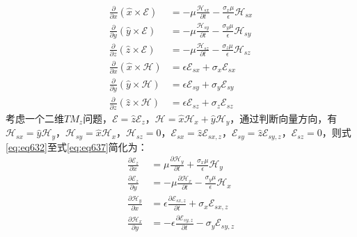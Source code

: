 \documentclass{article}
\numberwithin{equation}{section}
\renewcommand{\vec}[1]{\boldsymbol{#1}}
\begin{document}
\begin{align}
    \label{eq:eq632}
    \frac{\partial}{\partial x}(\hat{x}\times\vec{\mathcal{E}})&=-\mu\frac{\vec{\mathcal{H}}_{sx}}{\partial t}-\frac{\sigma_x\mu}{\epsilon}\vec{\mathcal{H}}_{sx} \\
    \label{eq:eq633}
    \frac{\partial}{\partial y}(\hat{y}\times\vec{\mathcal{E}})&=-\mu\frac{\vec{\mathcal{H}}_{sy}}{\partial t}-\frac{\sigma_y\mu}{\epsilon}\vec{\mathcal{H}}_{sy} \\
    \label{eq:eq634}
    \frac{\partial}{\partial z}(\hat{z}\times\vec{\mathcal{E}})&=-\mu\frac{\vec{\mathcal{H}}_{sz}}{\partial t}-\frac{\sigma_z\mu}{\epsilon}\vec{\mathcal{H}}_{sz} \\
    \label{eq:eq635}
    \frac{\partial}{\partial x}(\hat{x}\times\vec{\mathcal{H}})&=\epsilon\vec{\mathcal{E}}_{sx}+\sigma_x\vec{\mathcal{E}}_{sx} \\
    \label{eq:eq636}
    \frac{\partial}{\partial y}(\hat{y}\times\vec{\mathcal{H}})&=\epsilon\vec{\mathcal{E}}_{sy}+\sigma_y\vec{\mathcal{E}}_{sy} \\
    \label{eq:eq637}
    \frac{\partial}{\partial z}(\hat{z}\times\vec{\mathcal{H}})&=\epsilon\vec{\mathcal{E}}_{sz}+\sigma_z\vec{\mathcal{E}}_{sz}
\end{align}
考虑一个二维$TM_z$问题，$\vec{\mathcal{E}}=\hat{z}\mathcal{E}_z$，$\vec{\mathcal{H}}=\hat{x}\mathcal{H}_x+\hat{y}\mathcal{H}_y$，通过判断向量方向，有$\vec{\mathcal{H}}_{sx}=\hat{y}\mathcal{H}_y$，$\vec{\mathcal{H}}_{sy}=\hat{x}\mathcal{H}_x$，$\vec{\mathcal{H}}_{sz}=0$，$\vec{\mathcal{E}}_{sx}=\hat{z}\mathcal{E}_{sx,z}$，$\vec{\mathcal{E}}_{sy}=\hat{z}\mathcal{E}_{sy,z}$，$\vec{\mathcal{E}}_{sz}=0$，则式\ref{eq:eq632}至式\ref{eq:eq637}简化为：
\begin{align}
    \label{eq:eq638}
    \frac{\partial \mathcal{E}_z}{\partial x}&=\mu\frac{\partial\mathcal{H}_{y}}{\partial t}+\frac{\sigma_x\mu}{\epsilon}\mathcal{H}_{y} \\
    \label{eq:eq639}
    \frac{\partial \mathcal{E}_z}{\partial y}&=-\mu\frac{\partial\mathcal{H}_{x}}{\partial t}-\frac{\sigma_y\mu}{\epsilon}\mathcal{H}_{x} \\
    \label{eq:eq640}
    \frac{\partial \mathcal{H}_y}{\partial x}&=\epsilon\frac{\partial\mathcal{E}_{sx,z}}{\partial t}+\sigma_x\mathcal{E}_{sx,z} \\
    \label{eq:eq641}
    \frac{\partial \mathcal{H}_x}{\partial y}&=-\epsilon\frac{\partial\mathcal{E}_{sy,z}}{\partial t}-\sigma_y\mathcal{E}_{sy,z}
\end{align}
\end{document}

